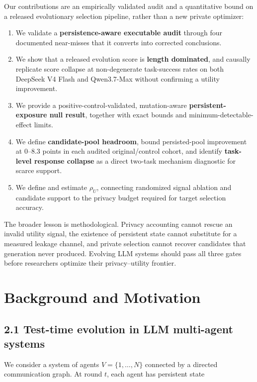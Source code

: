 \documentclass{article}
\begin{document}
Our contributions are an empirically validated audit and a quantitative bound on a released evolutionary selection pipeline, rather than a new private optimizer:

\begin{enumerate}
  \item We validate a \textbf{persistence-aware executable audit} through four documented near-misses that it converts into corrected conclusions.
  \item We show that a released evolution score is \textbf{length dominated}, and causally replicate score collapse at non-degenerate task-success rates on both DeepSeek V4 Flash and Qwen3.7-Max without confirming a utility improvement.
  \item We provide a positive-control-validated, mutation-aware \textbf{persistent-exposure null result}, together with exact bounds and minimum-detectable-effect limits.
  \item We define \textbf{candidate-pool headroom}, bound persisted-pool improvement at 0--8.3 points in each audited original/control cohort, and identify \textbf{task-level response collapse} as a direct two-task mechanism diagnostic for scarce support.
  \item We define and estimate \(\rho_U\), connecting randomized signal ablation and candidate support to the privacy budget required for target selection accuracy.
\end{enumerate}

The broader lesson is methodological. Privacy accounting cannot rescue an invalid utility signal, the existence of persistent state cannot substitute for a measured leakage channel, and private selection cannot recover candidates that generation never produced. Evolving LLM systems should pass all three gates before researchers optimize their privacy--utility frontier.

\section{Background and Motivation}

\subsection{2.1 Test-time evolution in LLM multi-agent systems}

We consider a system of agents \(V=\{1,\ldots,N\}\) connected by a directed communication graph. At round \(t\), each agent has persistent state
\end{document}

